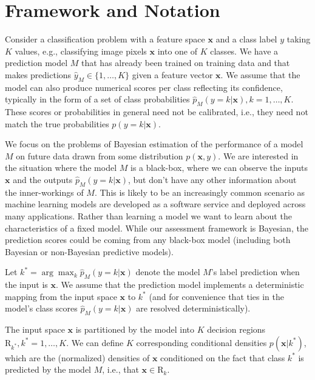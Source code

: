 \documentclass{article}
\newcommand{\ux}{{\mathbf{x}}}
\begin{document}
\section{Framework and Notation}

Consider a classification problem with a feature space $\ux$ and a class label $y$ taking $K$ values, e.g., classifying image pixels $\ux$ into one of $K$ classes.
We have a prediction model $M$ that has already been trained on training data and that makes predictions $\hat{y}_M \in \{1, \ldots, K\}$ given a feature vector $\ux$.
We assume that the model can also produce numerical scores per class reflecting its confidence, typically in the form of a set of class probabilities $\hat{p}_M(y = k | \ux), k = 1,\ldots,K$.
These scores or probabilities in general need not be calibrated, i.e., they need not match the true probabilities $p(y=k | \ux)$.

We focus on the problems of Bayesian estimation of the performance of a model $M$ on future data drawn from some distribution $p(\ux,y)$.
We are interested in the situation where the model $M$ is a black-box, where we can observe the inputs $\ux$ and the outputs $\hat{p}_M(y = k | \ux)$, but don't have any other information about the inner-workings of $M$.
This is likely to be an increasingly common scenario as machine learning models are developed as a software service and deployed across many applications. Rather than learning a model we want to learn about the characteristics of a fixed model.
While our assessment framework is Bayesian,
the prediction scores could be coming from any black-box model (including both Bayesian or non-Bayesian predictive models).


Let $k^* = \arg \max_k \hat{p}_M(y = k | \ux)$ denote the model $M$'s label prediction when the input is $\ux$.
We assume that the prediction model implements a deterministic mapping from the input space $\ux$ to $k^*$ (and for convenience that ties in the model's class scores $\hat{p}_M(y = k | \ux)$ are resolved deterministically).

The input space $\ux$ is partitioned by the model into $K$ decision regions $\mbox{R}_{k^*},  k^* = 1,\ldots,K$.
We can define $K$ corresponding conditional densities  $p(\ux | k^*)$, which are the (normalized) densities of $\ux$ conditioned on the fact that class $k^*$ is predicted by the model $M$, i.e., that $\ux \in \mbox{R}_k$.
\end{document}

